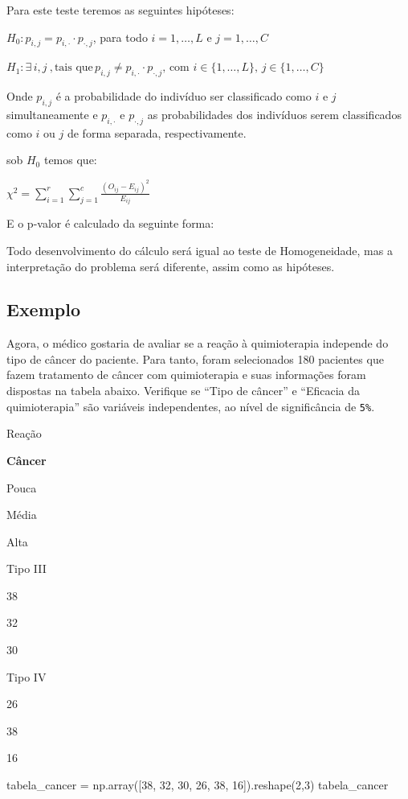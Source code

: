 \documentclass[
  letterpaper,
  DIV=11,
  numbers=noendperiod]{scrreprt}
\newenvironment{Shaded}{\begin{snugshade}}{\end{snugshade}}
\newcommand{\DecValTok}[1]{\textcolor[rgb]{0.68,0.00,0.00}{#1}}
\newcommand{\NormalTok}[1]{\textcolor[rgb]{0.00,0.23,0.31}{#1}}
\newcommand{\OperatorTok}[1]{\textcolor[rgb]{0.37,0.37,0.37}{#1}}
\begin{document}
Para este teste teremos as seguintes hipóteses:

\(H_{0} : p_{i, j} = p_{i,\cdot}\cdot p_{\cdot,j}\), para todo
\(i = 1, …, L\) e \(j = 1, …, C\)

\(H_1: \exists \, i, j \ , \text{tais que} \, p_{i,j} \neq p_{i,\cdot} \cdot p_{\cdot,j}, \, \text{com } i \in \{1, \dots, L\}, \, j \in \{1, \dots, C\}\)

Onde \(p_{i,j}\) é a probabilidade do indivíduo ser classificado como
\(i\) e \(j\) simultaneamente e \(p_{i,\cdot}\) e \(p_{\cdot,j}\) as
probabilidades dos indivíduos serem classificados como \(i\) ou \(j\) de
forma separada, respectivamente.

sob \(H_0\) temos que:

\(\chi^2 = \displaystyle\sum_{i=1}^r \displaystyle\sum_{j=1}^c \frac{(O_{ij} - E_{ij})^2}{E_{ij}}\)

E o p-valor é calculado da seguinte forma:

Todo desenvolvimento do cálculo será igual ao teste de Homogeneidade,
mas a interpretação do problema será diferente, assim como as hipóteses.

\hypertarget{exemplo-9}{%
\subsection{Exemplo}\label{exemplo-9}}

Agora, o médico gostaria de avaliar se a reação à quimioterapia
independe do tipo de câncer do paciente. Para tanto, foram selecionados
180 pacientes que fazem tratamento de câncer com quimioterapia e suas
informações foram dispostas na tabela abaixo. Verifique se ``Tipo de
câncer'' e ``Eficacia da quimioterapia'' são variáveis independentes, ao
nível de significância de \texttt{5\%}.

Reação

\textbf{Câncer}

Pouca

Média

Alta

Tipo III

38

32

30

Tipo IV

26

38

16

\begin{Shaded}
\begin{Highlighting}[]
\NormalTok{tabela\_cancer }\OperatorTok{=}\NormalTok{ np.array([}\DecValTok{38}\NormalTok{, }\DecValTok{32}\NormalTok{, }\DecValTok{30}\NormalTok{, }\DecValTok{26}\NormalTok{, }\DecValTok{38}\NormalTok{, }\DecValTok{16}\NormalTok{]).reshape(}\DecValTok{2}\NormalTok{,}\DecValTok{3}\NormalTok{)}
\NormalTok{tabela\_cancer}
\end{Highlighting}
\end{Shaded}
\end{document}
